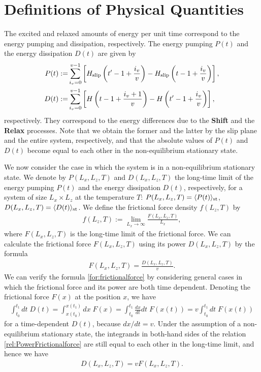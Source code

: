 \section{Definitions of Physical Quantities}
The excited and relaxed amounts of energy per unit time correspond to the energy pumping and dissipation, respectively. The energy pumping $P(t)$ and the energy dissipation $D(t)$ are given by
\begin{align}
P(t):=&\sum_{i_{v}=0}^{v-1}\left[ H_{\rm slip}\left(t'-1+\frac{i_{v}}{v}\right) - H_{\rm slip}\left(t-1+\frac{i_{v}}{v}\right)\right]\label{def:Pump},\\
D(t):=&\sum_{i_{v}=0}^{v-1}\left[ H\left(t-1+\frac{i_{v}+1}{v}\right) - H\left(t'-1+\frac{i_{v}}{v}\right)\right]\label{def:Diss},
\end{align}
respectively. They correspond to the energy differences due to the \textbf{Shift} and the \textbf{Relax} processes. Note that we obtain the former and the latter by the slip plane and the entire system, respectively, and that the absolute values of $P(t)$ and $D(t)$ become equal to each other in the non-equilibrium stationary state.

We now consider the case in which the system is in a non-equilibrium stationary state. We denote by $P(L_{x}, L_{z}, T)$ and $D(L_{x}, L_{z}, T)$ the long-time limit of the energy pumping $P(t)$ and the energy dissipation $D(t)$, respectively, for a system of size $L_{x}\times L_{z}$ at the temperature $T$: $P(L_{x},L_{z},T)=\langle P(t)\rangle_{\rm st}$, $D(L_{x},L_{z},T)=\langle D(t)\rangle_{\rm st}$. We define the frictional force density $f(L_{z}, T)$ by
\begin{align}
f(L_{z}, T):=\lim_{L_{x}\to\infty}\frac{F(L_{x}, L_{z}, T)}{L_{x}},
\end{align}
where $F(L_{x}, L_{z}, T)$ is the long-time limit of the frictional force. We can calculate the frictional force $F(L_{x}, L_{z}, T)$ using its power $D(L_{x}, L_{z}, T)$ by the formula
\begin{align}
F(L_{x}, L_{z}, T)=\frac{D(L_{x}, L_{z}, T)}{v}\label{for:frictionalforce}.
\end{align}
We can verify the formula \eqref{for:frictionalforce} by considering general cases in which the frictional force and its power are both time dependent. Denoting the frictional force $F(x)$ at the position $x$, we have
\begin{align}
\int_{t_{0}}^{t_{1}}dt\;D(t)=\int_{x(t_{0})}^{x(t_{1})}dx\;F(x)=\int_{t_{0}}^{t_{1}}\frac{dx}{dt}dt\;F(x(t))=v\int_{t_{0}}^{t_{1}}dt\;F(x(t))\label{rel:PowerFrictionalforce}
\end{align}
for a time-dependent $D(t)$, because $dx/dt=v$. Under the assumption of a non-equilibrium stationary state, the integrands in both-hand sides of the relation \eqref{rel:PowerFrictionalforce} are still equal to each other in the long-time limit, and hence we have
\begin{align}
D(L_{x}, L_{z}, T)=vF(L_{x}, L_{z}, T).
\end{align}

